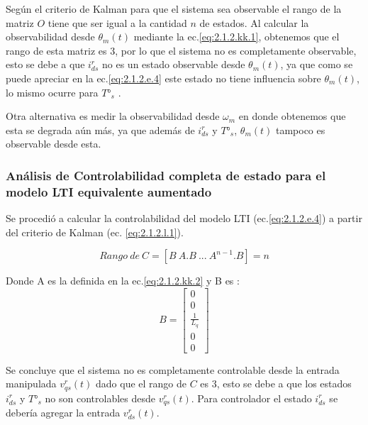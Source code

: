 \documentclass[10pt]{article}
\begin{document}
	
Según el criterio de Kalman para que el sistema sea observable el rango de la matriz $O$ tiene que ser igual a la cantidad $n$ de estados. Al calcular la observabilidad desde $\theta_{m}(t)$ mediante la ec.\ref{eq:2.1.2.kk.1}, obtenemos que el rango de esta matriz es 3, por lo que el sistema no es completamente observable, esto se debe a que $i^{r}_{ds}$ no es un estado observable desde $\theta_{m}(t)$, ya que como se puede apreciar en la ec.\ref{eq:2.1.2.e.4} este estado no tiene influencia sobre  $\theta_{m}(t)$, lo mismo ocurre para $T°_{s}$ .

Otra alternativa es medir la observabilidad desde $\omega_{m}$ en donde obtenemos que esta se degrada aún más, ya que además de $i^{r}_{ds}$ y  $T°_{s}$, $\theta_{m}(t)$ tampoco es observable desde esta. 

\subsubsection{Análisis de Controlabilidad completa de estado para el modelo LTI equivalente aumentado}
Se procedió a calcular la controlabilidad del modelo LTI (ec.\ref{eq:2.1.2.e.4}) a partir del criterio de Kalman (ec. \ref{eq:2.1.2.l.1}).

	\begin{equation}
		Rango \ de \ C=[B \ A.B \ ... \ A^{n-1}.B]= n
	\label{eq:2.1.2.l.1}
	\end{equation}
	
	Donde A es la definida en la ec.\ref{eq:2.1.2.kk.2} y B es :
	\begin{equation}
		B= \begin{bmatrix}
	0  \\ 
	0 \\ 
	 \frac{1}{L_{q}}\\
	 0\\
	 0
	\end{bmatrix}
	\label{eq:2.1.2.l.2}
	\end{equation}
	
Se concluye que el sistema no es completamente controlable desde la entrada manipulada $v^{r}_{qs}(t)$ dado que el rango de $C$ es 3, esto se debe a que los estados $i^{r}_{ds}$ y $T°_{s}$ no son controlables desde $v^{r}_{qs}(t)$.
Para controlador el estado $i^{r}_{ds}$ se debería agregar la entrada $v^{r}_{ds}(t)$.
\end{document}
